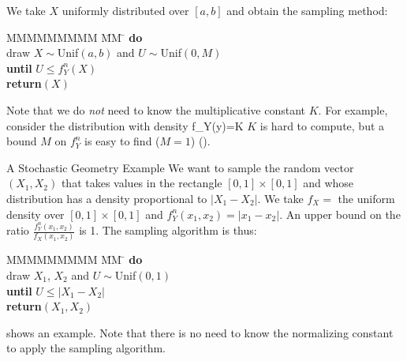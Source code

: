 We take $X$ uniformly distributed over $[a,b]$ and
obtain the sampling method:
\begin{tabbing}
  MMMMMMMMM \= MM \=  \kill
  \>\textbf{do}  \\
  \>  \> draw $X\sim$Unif$(a,b)$ and $U\sim$Unif$(0,M)$\\
  \>\textbf{until} $U \leq f_Y^n(X)$ \\
  \>\textbf{return}$(X)$
\end{tabbing}
Note that we do \emph{not} need to know the multiplicative
constant $K$. For example, consider the distribution with density
 \be f_Y(y)=K  
 \ee
 $K$ is hard to compute, but a bound $M$ on $f^n_Y$ is easy to find
($M=1$) ().
\begin{ex}{A Stochastic Geometry Example}
We want to sample the random vector $(X_1,X_2)$ that takes values
in the rectangle $[0,1] \times [0,1]$ and whose distribution has a
density proportional to $|X_1-X_2|$. We take $f_X=$ the uniform
density over $[0,1] \times [0,1]$ and $f_Y^n(x_1, x_2)=|x_1-x_2|$.
An upper bound on the ratio $\frac{f_Y^n(x_1, x_2)}{f_X(x_1,x_2)}$
is 1. The sampling algorithm is thus:
\begin{tabbing}
  MMMMMMMMM \= MM \=  \kill
  \>\textbf{do}  \\
  \>  \> draw $X_1$, $X_2$ and $U\sim$Unif$(0,1)$\\
  \>\textbf{until} $U \leq |X_1 - X_2|$ \\
  \>\textbf{return}$(X_1, X_2)$
\end{tabbing}
  shows an example. Note that there is no need to
 know the normalizing constant to apply the sampling algorithm.
\end{ex}
\begin{figure}[htp]
\begin{center}
\end{center}   
\end{figure}

